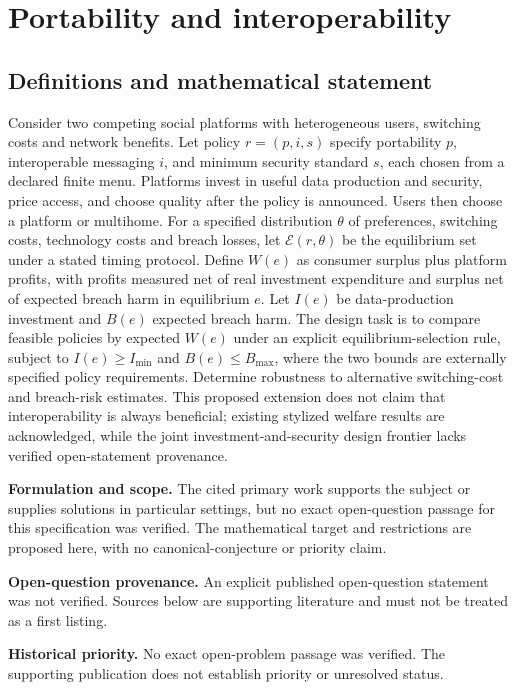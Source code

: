 \documentclass[11pt]{article}
\begin{document}
\section*{Portability and interoperability}\label{30007691}
\subsection{Definitions and mathematical statement}
Consider two competing social platforms with heterogeneous users, switching costs and network benefits. Let policy \(r=(p,i,s)\) specify portability \(p\), interoperable messaging \(i\), and minimum security standard \(s\), each chosen from a declared finite menu. Platforms invest in useful data production and security, price access, and choose quality after the policy is announced. Users then choose a platform or multihome. For a specified distribution \(\theta\) of preferences, switching costs, technology costs and breach losses, let \(\mathcal E(r,\theta)\) be the equilibrium set under a stated timing protocol. Define \(W(e)\) as consumer surplus plus platform profits, with profits measured net of real investment expenditure and surplus net of expected breach harm in equilibrium \(e\). Let \(I(e)\) be data-production investment and \(B(e)\) expected breach harm. The design task is to compare feasible policies by expected \(W(e)\) under an explicit equilibrium-selection rule, subject to \(I(e)\geq I_{\min}\) and \(B(e)\leq B_{\max}\), where the two bounds are externally specified policy requirements. Determine robustness to alternative switching-cost and breach-risk estimates. This proposed extension does not claim that interoperability is always beneficial; existing stylized welfare results are acknowledged, while the joint investment-and-security design frontier lacks verified open-statement provenance.

\par\textbf{Formulation and scope.} The cited primary work supports the subject or supplies solutions in particular settings, but no exact open-question passage for this specification was verified. The mathematical target and restrictions are proposed here, with no canonical-conjecture or priority claim.

\par\textbf{Open-question provenance.} An explicit published open-question statement was not verified. Sources below are supporting literature and must not be treated as a first listing.

\par\textbf{Historical priority.} No exact open-problem passage was verified. The supporting publication does not establish priority or unresolved status.
\end{document}

